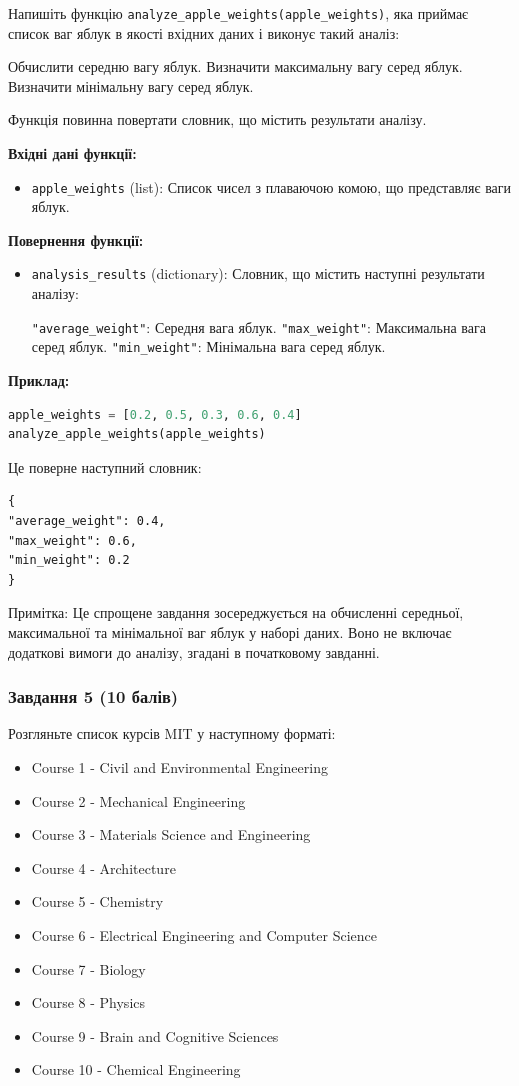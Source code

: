 \documentclass[12pt]{article}
\begin{document}
Напишіть функцію \texttt{analyze\_apple\_weights(apple\_weights)}, яка приймає список ваг яблук в якості вхідних даних і виконує такий аналіз:

Обчислити середню вагу яблук.
Визначити максимальну вагу серед яблук.
Визначити мінімальну вагу серед яблук.

Функція повинна повертати словник, що містить результати аналізу.

\textbf{Вхідні дані функції:}
\begin{itemize}
\item \texttt{apple\_weights} (list): Список чисел з плаваючою комою, що представляє ваги яблук.
\end{itemize}

\textbf{Повернення функції:}
\begin{itemize}
\item \texttt{analysis\_results} (dictionary): Словник, що містить наступні результати аналізу:

    \texttt{"average\_weight"}: Середня вага яблук.
    \texttt{"max\_weight"}: Максимальна вага серед яблук.
    \texttt{"min\_weight"}: Мінімальна вага серед яблук.
    \end{itemize}

\textbf{Приклад:}
\begin{lstlisting}[language=Python]
apple_weights = [0.2, 0.5, 0.3, 0.6, 0.4]
analyze_apple_weights(apple_weights)
\end{lstlisting}
Це поверне наступний словник:
\begin{verbatim}
{
"average_weight": 0.4,
"max_weight": 0.6,
"min_weight": 0.2
}
\end{verbatim}

Примітка: Це спрощене завдання зосереджується на обчисленні середньої, максимальної та мінімальної ваг яблук у наборі даних. Воно не включає додаткові вимоги до аналізу, згадані в початковому завданні.

\subsubsection{Завдання 5 (10 балів)}
Розгляньте список курсів MIT у наступному форматі:

\begin{itemize}
\item Course 1 - Civil and Environmental Engineering
\item Course 2 - Mechanical Engineering
\item Course 3 - Materials Science and Engineering
\item Course 4 - Architecture
\item Course 5 - Chemistry
\item Course 6 - Electrical Engineering and Computer Science
\item Course 7 - Biology
\item Course 8 - Physics
\item Course 9 - Brain and Cognitive Sciences
\item Course 10 - Chemical Engineering
\end{itemize}
\end{document}
